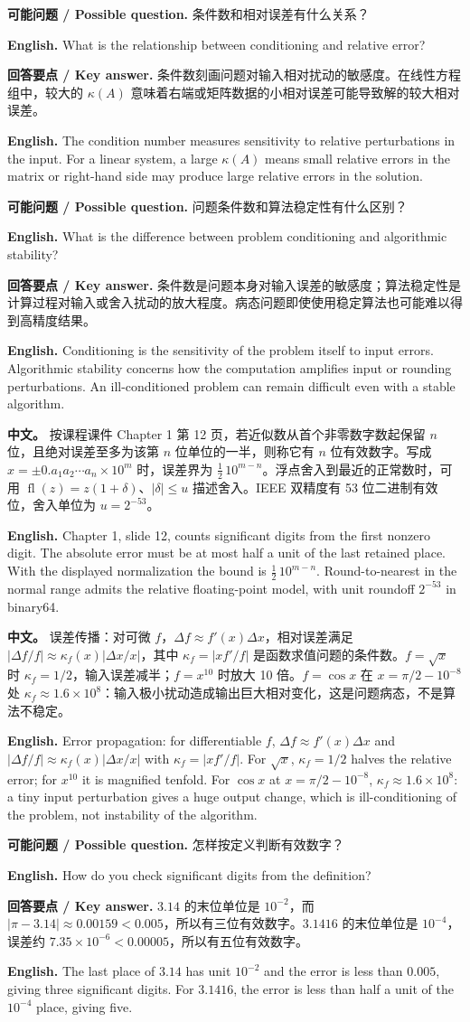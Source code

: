 \documentclass[UTF8,11pt,a4paper]{ctexart}
\newcommand{\EN}[1]{\par\noindent\textbf{English.} #1\par}
\newcommand{\ASK}[4]{\par\noindent\textbf{可能问题 / Possible question.} #1\par\EN{#2}\noindent\textbf{回答要点 / Key answer.} #3\par\EN{#4}\medskip}
\newcommand{\APS}[2]{\par\noindent\textbf{中文。} #1\par\noindent\textbf{English.} #2\par\smallskip}
\begin{document}
\ASK{条件数和相对误差有什么关系？}{What is the relationship between conditioning and relative error?}{条件数刻画问题对输入相对扰动的敏感度。在线性方程组中，较大的 $\kappa(A)$ 意味着右端或矩阵数据的小相对误差可能导致解的较大相对误差。}{The condition number measures sensitivity to relative perturbations in the input. For a linear system, a large $\kappa(A)$ means small relative errors in the matrix or right-hand side may produce large relative errors in the solution.}

\ASK{问题条件数和算法稳定性有什么区别？}{What is the difference between problem conditioning and algorithmic stability?}{条件数是问题本身对输入误差的敏感度；算法稳定性是计算过程对输入或舍入扰动的放大程度。病态问题即使使用稳定算法也可能难以得到高精度结果。}{Conditioning is the sensitivity of the problem itself to input errors. Algorithmic stability concerns how the computation amplifies input or rounding perturbations. An ill-conditioned problem can remain difficult even with a stable algorithm.}

\APS{按课程课件 Chapter 1 第 12 页，若近似数从首个非零数字数起保留 $n$ 位，且绝对误差至多为该第 $n$ 位单位的一半，则称它有 $n$ 位有效数字。写成 $x=\pm0.a_1a_2\cdots a_n\times10^m$ 时，误差界为 $\tfrac12\,10^{m-n}$。浮点舍入到最近的正常数时，可用 $\operatorname{fl}(z)=z(1+\delta)$、$|\delta|\le u$ 描述舍入。IEEE 双精度有 53 位二进制有效位，舍入单位为 $u=2^{-53}$。}{Chapter 1, slide 12, counts significant digits from the first nonzero digit. The absolute error must be at most half a unit of the last retained place. With the displayed normalization the bound is $\tfrac12\,10^{m-n}$. Round-to-nearest in the normal range admits the relative floating-point model, with unit roundoff $2^{-53}$ in binary64.}
\APS{误差传播：对可微 $f$，$\Delta f\approx f'(x)\Delta x$，相对误差满足 $|\Delta f/f|\approx\kappa_f(x)|\Delta x/x|$，其中 $\kappa_f=|xf'/f|$ 是函数求值问题的条件数。$f=\sqrt x$ 时 $\kappa_f=1/2$，输入误差减半；$f=x^{10}$ 时放大 10 倍。$f=\cos x$ 在 $x=\pi/2-10^{-8}$ 处 $\kappa_f\approx1.6\times10^{8}$：输入极小扰动造成输出巨大相对变化，这是问题病态，不是算法不稳定。}{Error propagation: for differentiable $f$, $\Delta f\approx f'(x)\Delta x$ and $|\Delta f/f|\approx\kappa_f(x)|\Delta x/x|$ with $\kappa_f=|xf'/f|$. For $\sqrt x$, $\kappa_f=1/2$ halves the relative error; for $x^{10}$ it is magnified tenfold. For $\cos x$ at $x=\pi/2-10^{-8}$, $\kappa_f\approx1.6\times10^{8}$: a tiny input perturbation gives a huge output change, which is ill-conditioning of the problem, not instability of the algorithm.}
\ASK{怎样按定义判断有效数字？}{How do you check significant digits from the definition?}{$3.14$ 的末位单位是 $10^{-2}$，而 $|\pi-3.14|\approx0.00159<0.005$，所以有三位有效数字。$3.1416$ 的末位单位是 $10^{-4}$，误差约 $7.35\times10^{-6}<0.00005$，所以有五位有效数字。}{The last place of $3.14$ has unit $10^{-2}$ and the error is less than $0.005$, giving three significant digits. For $3.1416$, the error is less than half a unit of the $10^{-4}$ place, giving five.}
\end{document}
